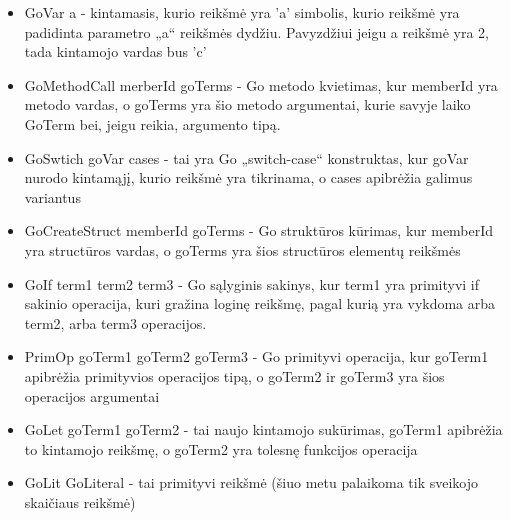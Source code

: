\documentclass{VUMIFPSkursinis}
\begin{document}
	\begin{itemize}
		\item GoVar a - kintamasis, kurio reikšmė yra 'a' simbolis, kurio reikšmė yra padidinta parametro „a“ reikšmės dydžiu. Pavyzdžiui jeigu a reikšmė yra 2, tada kintamojo vardas bus 'c'
		\item GoMethodCall merberId goTerms - Go metodo kvietimas, kur memberId yra metodo vardas, o goTerms yra šio metodo argumentai, kurie savyje laiko GoTerm bei, jeigu reikia, argumento tipą.
		\item GoSwtich goVar cases - tai yra Go „switch-case“ konstruktas, kur goVar nurodo kintamąjį, kurio reikšmė yra tikrinama, o cases apibrėžia galimus variantus
		\item GoCreateStruct memberId goTerms - Go struktūros kūrimas, kur memberId yra structūros vardas, o goTerms yra šios structūros elementų reikšmės
		\item GoIf term1 term2 term3 - Go sąlyginis sakinys, kur term1 yra primityvi if sakinio operacija, kuri gražina loginę reikšmę, pagal kurią yra vykdoma arba term2, arba term3 operacijos.
		\item PrimOp goTerm1 goTerm2 goTerm3 - Go primityvi operacija, kur goTerm1 apibrėžia primityvios operacijos tipą, o goTerm2 ir goTerm3 yra šios operacijos argumentai
		\item GoLet goTerm1 goTerm2 - tai naujo kintamojo sukūrimas, goTerm1 apibrėžia to kintamojo reikšmę, o goTerm2 yra tolesnę funkcijos operacija
		\item GoLit GoLiteral - tai primityvi reikšmė (šiuo metu palaikoma tik sveikojo skaičiaus reikšmė)
	\end{itemize}
\end{document}
